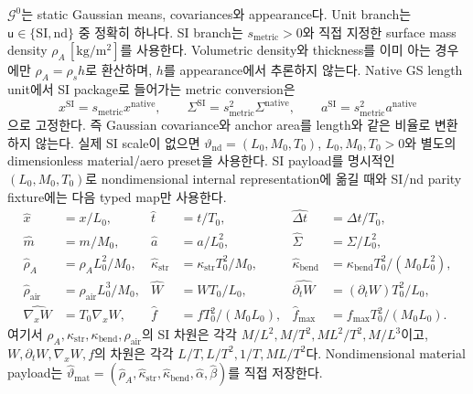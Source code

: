 \documentclass[11pt]{article}
\begin{document}
\(\mathcal G^0\)는 static Gaussian means, covariances와 appearance다.
Unit branch는 \(\mathsf u\in\{\mathrm{SI},\mathrm{nd}\}\) 중 정확히 하나다.
SI branch는 \(s_{\mathrm{metric}}>0\)와 직접 지정한 surface mass density
\(\rho_A\,[\mathrm{kg}/\mathrm{m}^2]\)를 사용한다. Volumetric density와 thickness를 이미 아는 경우에만
\(\rho_A=\rho_s h\)로 환산하며, \(h\)를 appearance에서 추론하지 않는다.
Native GS length unit에서 SI package로 들어가는 metric conversion은
\begin{equation}
  x^{\mathrm{SI}}=s_{\mathrm{metric}}x^{\mathrm{native}},\qquad
  \Sigma^{\mathrm{SI}}=s_{\mathrm{metric}}^2\Sigma^{\mathrm{native}},\qquad
  a^{\mathrm{SI}}=s_{\mathrm{metric}}^2a^{\mathrm{native}}
  \label{eq:minimal-si-metric-conversion}
\end{equation}
으로 고정한다. 즉 Gaussian covariance와 anchor area를 length와 같은 비율로 변환하지 않는다.
실제 SI scale이 없으면
\(\vartheta_{\mathrm{nd}}=(L_0,M_0,T_0)\), \(L_0,M_0,T_0>0\)와
별도의 dimensionless material/aero preset을 사용한다. SI payload를 명시적인
\((L_0,M_0,T_0)\)로 nondimensional internal representation에 옮길 때와 SI/nd parity fixture에는
다음 typed map만 사용한다.
\begin{equation}
\begin{aligned}
  \widehat x&=x/L_0,&
  \widehat t&=t/T_0,&
  \widehat{\Delta t}&=\Delta t/T_0,\\
  \widehat m&=m/M_0,&
  \widehat a&=a/L_0^2,&
  \widehat\Sigma&=\Sigma/L_0^2,\\
  \widehat\rho_A&=\rho_A L_0^2/M_0,&
  \widehat\kappa_{\mathrm{str}}&=\kappa_{\mathrm{str}}T_0^2/M_0,&
  \widehat\kappa_{\mathrm{bend}}&=\kappa_{\mathrm{bend}}T_0^2/(M_0L_0^2),\\
  \widehat\rho_{\mathrm{air}}&=\rho_{\mathrm{air}}L_0^3/M_0,&
  \widehat W&=WT_0/L_0,&
  \widehat{\partial_tW}&=(\partial_tW)T_0^2/L_0,\\
  \widehat{\nabla_xW}&=T_0\nabla_xW,&
  \widehat f&=fT_0^2/(M_0L_0),&
  \widehat f_{\max}&=f_{\max}T_0^2/(M_0L_0).
\end{aligned}
  \label{eq:minimal-si-nd-typed-map}
\end{equation}
여기서 \(\rho_A,\kappa_{\mathrm{str}},\kappa_{\mathrm{bend}},\rho_{\mathrm{air}}\)의 SI 차원은 각각
\(M/L^2,M/T^2,ML^2/T^2,M/L^3\)이고,
\(W,\partial_tW,\nabla_xW,f\)의 차원은 각각 \(L/T,L/T^2,1/T,ML/T^2\)다.
Nondimensional material payload는
\(\widehat\vartheta_{\mathrm{mat}}
=(\widehat\rho_A,\widehat\kappa_{\mathrm{str}},
\widehat\kappa_{\mathrm{bend}},\widehat\alpha,\widehat\beta)\)를 직접 저장한다.
\end{document}
